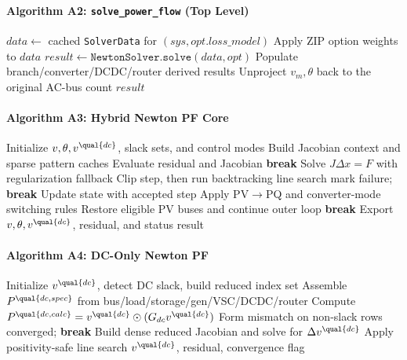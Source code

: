 \paragraph{Algorithm A2: \texttt{solve\_power\_flow} (Top Level)}
\begin{algorithmic}[1]
  \State $data \gets$ cached \texttt{SolverData} for $(sys, opt.loss\_model)$
  \State Apply ZIP option weights to $data$
  \State $result \gets \texttt{NewtonSolver.solve}(data, opt)$
  \State Populate branch/converter/DCDC/router derived results
    \State Unproject \(v_m,\theta\) back to the original AC-bus count
  \EndIf
  \State \Return $result$
\EndProcedure
\end{algorithmic}

\paragraph{Algorithm A3: Hybrid Newton PF Core}
\begin{algorithmic}[1]
  \State Initialize \(v,\theta,v^{\qual{dc}}\), slack sets, and control modes
    \State Build Jacobian context and sparse pattern caches
      \State Evaluate residual and Jacobian
       \State \textbf{break} \EndIf
      \State Solve \(J\Delta x = F\) with regularization fallback
      \State Clip step, then run backtracking line search
       \State mark failure; \textbf{break} \EndIf
      \State Update state with accepted step
      \State Apply PV\(\rightarrow\)PQ and converter-mode switching rules
    \EndFor
      \State Restore eligible PV buses and continue outer loop
    \Else
      \State \textbf{break}
    \EndIf
  \EndFor
  \State Export \(v,\theta,v^{\qual{dc}}\), residual, and status
  \State \Return result
\EndProcedure
\end{algorithmic}

\paragraph{Algorithm A4: DC-Only Newton PF}
\begin{algorithmic}[1]
  \State Initialize \(v^{\qual{dc}}\), detect DC slack, build reduced index set
    \State Assemble \(P^{\qual{dc,spec}}\) from bus/load/storage/gen/VSC/DCDC/router
    \State Compute \(P^{\qual{dc,calc}} = v^{\qual{dc}} \odot (G_{dc}v^{\qual{dc}})\)
    \State Form mismatch on non-slack rows
     \State converged; \textbf{break} \EndIf
    \State Build dense reduced Jacobian and solve for \(\Delta v^{\qual{dc}}\)
    \State Apply positivity-safe line search
  \EndFor
  \State \Return \(v^{\qual{dc}}\), residual, convergence flag
\EndProcedure
\end{algorithmic}

